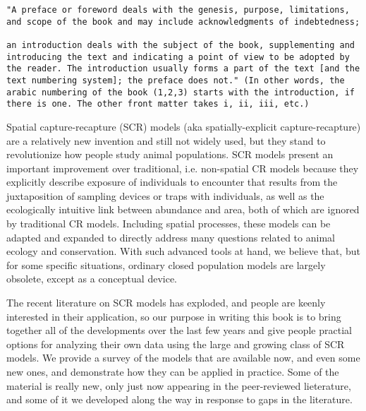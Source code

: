 \begin{verbatim}
"A preface or foreword deals with the genesis, purpose, limitations,
and scope of the book and may include acknowledgments of indebtedness;

an introduction deals with the subject of the book, supplementing and
introducing the text and indicating a point of view to be adopted by
the reader. The introduction usually forms a part of the text [and the
text numbering system]; the preface does not." (In other words, the
arabic numbering of the book (1,2,3) starts with the introduction, if
there is one. The other front matter takes i, ii, iii, etc.)
\end{verbatim}


Spatial capture-recapture (SCR) models (aka spatially-explicit
capture-recapture) are a relatively new invention and still not widely
used, but they stand to revolutionize how people study animal
populations.
SCR models present an important improvement over traditional,
i.e. non-spatial CR models because they explicitly describe exposure
of individuals to encounter that results from the juxtaposition of
sampling devices or traps with individuals, as well as the
ecologically intuitive link between abundance and area, both of which
are ignored by traditional CR models. Including spatial processes,
these models can be adapted and expanded to directly address many
questions related to animal ecology and conservation. With such
advanced tools at hand, we believe that, but for some specific
situations, ordinary closed population models are largely obsolete,
except as a conceptual device.

The recent literature on SCR models has exploded, and people are
keenly interested in their application, so our purpose in writing this
book is to bring together all of the developments over the last few
years and give people practial options for analyzing their own data
using the large and growing class of SCR models.  We provide a survey
of the models that are available now, and even some new ones, and
demonstrate how they can be applied in practice. Some of the material
is really new, only just now appearing in the peer-reviewed
lieterature, and some of it we developed along the way in response to
gaps in the literature.

